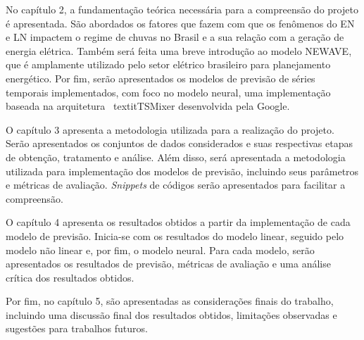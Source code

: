 No capítulo 2, a fundamentação teórica necessária para a compreensão do projeto é apresentada. São abordados os fatores
que fazem com que os fenômenos do EN e LN impactem o regime de chuvas no Brasil e a sua relação com a geração de 
energia elétrica. Também será feita uma breve introdução ao modelo NEWAVE,
que é amplamente utilizado pelo setor elétrico brasileiro para planejamento energético. Por fim, serão apresentados os modelos 
de previsão de séries temporais implementados, com foco no modelo neural, uma implementação baseada na arquitetura \
textit{TSMixer} desenvolvida pela Google.

O capítulo 3 apresenta a metodologia utilizada para a realização do projeto. Serão apresentados os conjuntos de dados
considerados e suas respectivas etapas de obtenção, tratamento e análise. Além disso, será apresentada a metodologia
utilizada para implementação dos modelos de previsão, incluindo seus parâmetros e métricas de avaliação. \textit{Snippets}
de códigos serão apresentados para facilitar a compreensão.

O capítulo 4 apresenta os resultados obtidos a partir da implementação de cada modelo de previsão. Inicia-se com os resultados
do modelo linear, seguido pelo modelo não linear e, por fim, o modelo neural. Para cada modelo, serão apresentados os
resultados de previsão, métricas de avaliação e uma análise crítica dos resultados obtidos.

Por fim, no capítulo 5, são apresentadas as considerações finais do trabalho, incluindo uma discussão final dos resultados
obtidos, limitações observadas e sugestões para trabalhos futuros.



